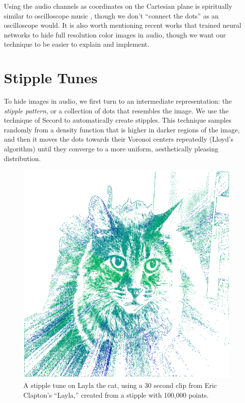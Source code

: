 \documentclass{article}
\begin{document}
Using the audio channels as coordinates on the Cartesian plane is spiritually similar to oscilloscope music \cite{felix2021_RenderingShapes, Charles2013, teschler2021}, though we don't ``connect the dots'' as an oscilloscope would.  It is also worth mentioning recent works that trained neural networks to hide full resolution color images \cite{cui_multi-stage_2021, geleta_pixinwav_2021, takahashi_source_2022, domenech2022hiding} in audio, though we want our technique to be easier to explain and implement.

\section{Stipple Tunes}

To hide images in audio, we first turn to an intermediate representation: the {\em stipple pattern}, or a collection of dots that resembles the image.  We use the technique of Secord \cite{secord2002weighted} to automatically create stipples.  This technique samples randomly from a density function that is higher in darker regions of the image, and then it moves the dots towards their Voronoi centers repeatedly (Lloyd's algorithm) until they converge to a more uniform, aesthetically pleasing distribution.

\begin{figure}
  \centering
  \includegraphics[width=0.8\columnwidth]{laylaViterbiStipple.png}
  \caption{A stipple tune on Layla the cat, using a 30 second clip from Eric Clapton's ``Layla,'' created from a stipple with 100,000 points.}
  \label{fig:laylaViterbiStipple}
\end{figure}
\end{document}
